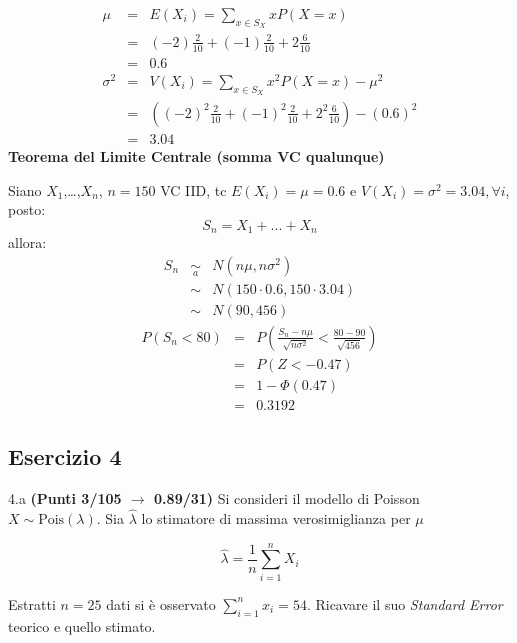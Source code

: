 \documentclass[
  11pt,
]{book}
\theoremstyle{mytheoremstyle}
\theoremstyle{mydefstyle}
\newenvironment{sol}
  {
  \begin{tcolorbox}[enhanced,breakable,arc=0.1mm,boxrule=1pt,colback=white,colframe=iblue,
  title=\bf \fontfamily{lmss}\selectfont \hspace{.5 cm} Soluzione,drop fuzzy shadow]

}{
\end{tcolorbox}
  }
\begin{document}
\begin{sol}
\begin{eqnarray*} \mu &=& E(X_i) = \sum_{x\in S_X}x P(X=x)\\ 
 &=& ( -2 ) \frac { 2 }{ 10 }+( -1 ) \frac { 2 }{ 10 }+ 2  \frac { 6 }{ 10 } \\ 
            &=& 0.6 \\ 
 \sigma^2 &=& V(X_i) = \sum_{x\in S_X}x^2 P(X=x)-\mu^2\\ 
 &=&\left( ( -2 ) ^2\frac { 2 }{ 10 }+( -1 ) ^2\frac { 2 }{ 10 }+ 2  ^2\frac { 6 }{ 10 } \right)-( 0.6 )^2\\ 
            &=& 3.04 
\end{eqnarray*}
\textbf{Teorema del Limite Centrale (somma VC qualunque)}

Siano \(X_1\),\ldots,\(X_n\), \(n=150\) VC IID, tc \(E(X_i)=\mu=0.6\) e \(V(X_i)=\sigma^2=3.04,\forall i\), posto:
\[
      S_n = X_1 + ... + X_n
      \]
allora:\begin{eqnarray*}
  S_n & \mathop{\sim}\limits_{a}& N(n\mu,n\sigma^2) \\
     &\sim & N(150\cdot0.6,150\cdot3.04) \\
     &\sim & N(90,456) 
  \end{eqnarray*}\begin{eqnarray*}
      P( S_n   <   80 ) 
        &=& P\left(  \frac { S_n  -  n\mu }{ \sqrt{n\sigma^2} }  <  \frac { 80  -  90 }{\sqrt{ 456 }} \right)  \\
                 &=& P\left(  Z   <   -0.47 \right) \\    
                 &=&  1-\Phi( 0.47 ) \\ &=&  0.3192 
      \end{eqnarray*}

\end{sol}

\subsection{Esercizio 4}\label{esercizio-4-41}

4.a \textbf{(Punti 3/105 \(\rightarrow\) 0.89/31)} Si consideri il modello di Poisson \(X\sim\text{Pois}(\lambda)\). Sia \(\hat\lambda\) lo stimatore di massima verosimiglianza per \(\mu\)

\[
  \hat\lambda = \frac 1n \sum_{i=1}^n X_i
\]

Estratti \(n=25\) dati si è osservato \(\sum_{i=1}^nx_i=54\). Ricavare il suo \emph{Standard Error} teorico e quello stimato.
\end{document}
